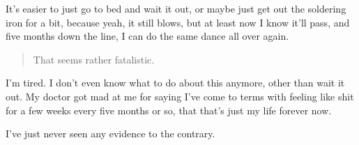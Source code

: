 It's easier to just go to bed and wait it out, or maybe just get out the soldering iron for a bit, because yeah, it still blows, but at least now I know it'll pass, and five months down the line, I can do the same dance all over again.

\begin{quote}
That seems rather fatalistic.
\end{quote}

I'm tired. I don't even know what to do about this anymore, other than wait it out. My doctor got mad at me for saying I've come to terms with feeling like shit for a few weeks every five months or so, that that's just my life forever now.

I've just never seen any evidence to the contrary.
